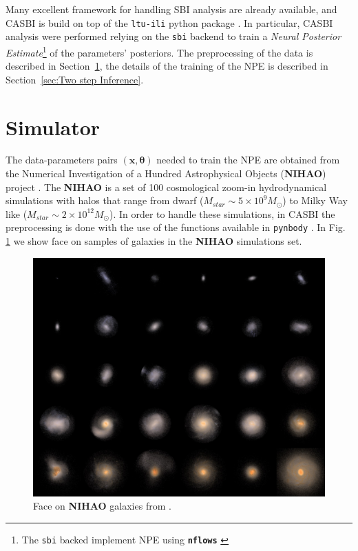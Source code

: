 Many excellent framework for handling SBI analysis are already available, and CASBI is build on top of the \texttt{ltu-ili} python package \cite{hoLtUILIAllinOneFramework2024}. In particular, CASBI analysis were performed relying on the \texttt{sbi} backend \cite{tejero-canteroSbiToolkitSimulationbased2020} to train a \textit{Neural Posterior Estimate}\footnote{The \texttt{sbi} backed implement NPE using \textbf{\texttt{nflows}} \cite{durkanNflowsNormalizingFlows2020}} of the parameters' posteriors. The preprocessing of the data is described in Section~\ref{sec:NIHAO}, the details of the training of the NPE is described in Section~\ref{sec:Two step Inference}.


\section{Simulator}\label{sec:NIHAO}
The data-parameters pairs $(\mathbf{x}, \boldsymbol{\theta})$ needed to train the NPE are obtained from the Numerical Investigation of a Hundred Astrophysical Objects (\textbf{NIHAO}) project \cite{wangNIHAOProjectReproducing2015}. The \textbf{NIHAO} is a set of 100 cosmological zoom-in hydrodynamical simulations with halos that range from dwarf ($M_{star} \sim 5 \times 10^9 M_\odot$) to Milky Way like ($M_{star} \sim 2 \times 10^{12} M_\odot$). In order to handle these simulations, in CASBI the preprocessing is done with the use of the functions available in \texttt{pynbody} \cite{pontzenPynbodyNBodySPH2013}. In Fig. \ref{fig:NIHAO} we show face on samples of galaxies in the \textbf{NIHAO} simulations set.

\begin{figure}[H]
    \centering
    \includegraphics[width=1\textwidth]{./figure/NIHAO.jpeg}
    \caption{Face on \textbf{NIHAO} galaxies from \cite{wangNIHAOProjectReproducing2015}.}
    \label{fig:NIHAO}
\end{figure}

